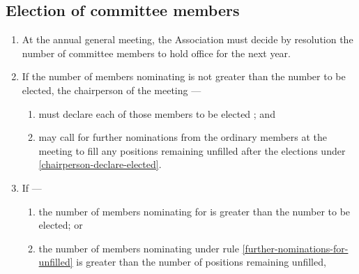 \documentclass[../constitution.tex]{subfiles}
\begin{document}
\hypertarget{election-of-committee-members}{%
\subsection{Election of  committee members}\label{election-of-committee-members}}

\begin{enumerate}

\item At the annual general meeting, the Association must decide by resolution the number of  committee members  to hold office for the next year.


\item If the number of members nominating  is not greater than the number to be elected, the chairperson of the meeting --- \label{nominating-committee-less-than-elected}

  \begin{enumerate}
  
  \item must declare each of those members to be elected ; and \label{chairperson-declare-elected}
  \item may call for further nominations from the ordinary members at the meeting to fill any positions remaining unfilled after the elections under  \ref{chairperson-declare-elected}. \label{further-nominations-for-unfilled}
  \end{enumerate}
\item If ---

  \begin{enumerate}
  
  \item the number of members nominating for  is greater than the number to be elected; or
  \item the number of members nominating under rule \ref{further-nominations-for-unfilled} is greater than the number of positions remaining unfilled,
  \end{enumerate}


\end{enumerate}
\end{document}
